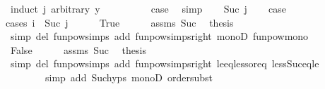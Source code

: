 \begin{isabellebody}
\ {\isacharparenleft}{\kern0pt}induct\ j\ arbitrary{\isacharcolon}{\kern0pt}\ y{\isacharparenright}{\kern0pt}\isanewline
\ \ \isamarkupfalse%
\ {}\isanewline
\ \ \isamarkupfalse%
\ \isamarkupfalse%
\ {\isacharquery}{\kern0pt}case\ \isamarkupfalse%
\ simp\isanewline
{}\isamarkupfalse%
\isanewline
\ \ \isamarkupfalse%
\ {\isacharparenleft}{\kern0pt}Suc\ j{\isacharparenright}{\kern0pt}\isanewline
\ \ \isamarkupfalse%
\ {\isacharquery}{\kern0pt}case\isanewline
\ \ \isamarkupfalse%
{\isacharparenleft}{\kern0pt}cases\ {\isachardoublequoteopen}i\ {\isacharequal}{\kern0pt}\ Suc\ j{\isachardoublequoteclose}{\isacharparenright}{\kern0pt}\isanewline
\ \ \ \ \isamarkupfalse%
\ True\isanewline
\ \ \ \ \isamarkupfalse%
\ assms{\isacharparenleft}{\kern0pt}{}{\isacharparenright}{\kern0pt}\ Suc\ \isamarkupfalse%
\ {\isacharquery}{\kern0pt}thesis\isanewline
\ \ \ \ \ \ \isamarkupfalse%
\ {\isacharparenleft}{\kern0pt}simp\ del{\isacharcolon}{\kern0pt}\ funpow{\isachardot}{\kern0pt}simps\ add{\isacharcolon}{\kern0pt}\ funpow{\isacharunderscore}{\kern0pt}simps{\isacharunderscore}{\kern0pt}right\ monoD\ funpow{\isacharunderscore}{\kern0pt}mono{\isacharparenright}{\kern0pt}\isanewline
\ \ \isamarkupfalse%
\isanewline
\ \ \ \ \isamarkupfalse%
\ False\isanewline
\ \ \ \ \isamarkupfalse%
\ assms{\isacharparenleft}{\kern0pt}{}{\isacharcomma}{\kern0pt}{}{\isacharparenright}{\kern0pt}\ Suc\ \isamarkupfalse%
\ {\isacharquery}{\kern0pt}thesis\isanewline
\ \ \ \ \ \ \isamarkupfalse%
\ {\isacharparenleft}{\kern0pt}simp\ del{\isacharcolon}{\kern0pt}\ funpow{\isachardot}{\kern0pt}simps\ add{\isacharcolon}{\kern0pt}\ funpow{\isacharunderscore}{\kern0pt}simps{\isacharunderscore}{\kern0pt}right\ le{\isacharunderscore}{\kern0pt}eq{\isacharunderscore}{\kern0pt}less{\isacharunderscore}{\kern0pt}or{\isacharunderscore}{\kern0pt}eq\ less{\isacharunderscore}{\kern0pt}Suc{\isacharunderscore}{\kern0pt}eq{\isacharunderscore}{\kern0pt}le{\isacharparenright}{\kern0pt}\isanewline
\ \ \ \ \ \ \ \ {\isacharparenleft}{\kern0pt}simp\ add{\isacharcolon}{\kern0pt}\ Suc{\isachardot}{\kern0pt}hyps\ monoD\ order{\isacharunderscore}{\kern0pt}subst{}{\isacharparenright}{\kern0pt}\isanewline
\ \ \isamarkupfalse%
\isanewline
{}\isamarkupfalse%
%
\endisatagproof

\end{isabellebody}

